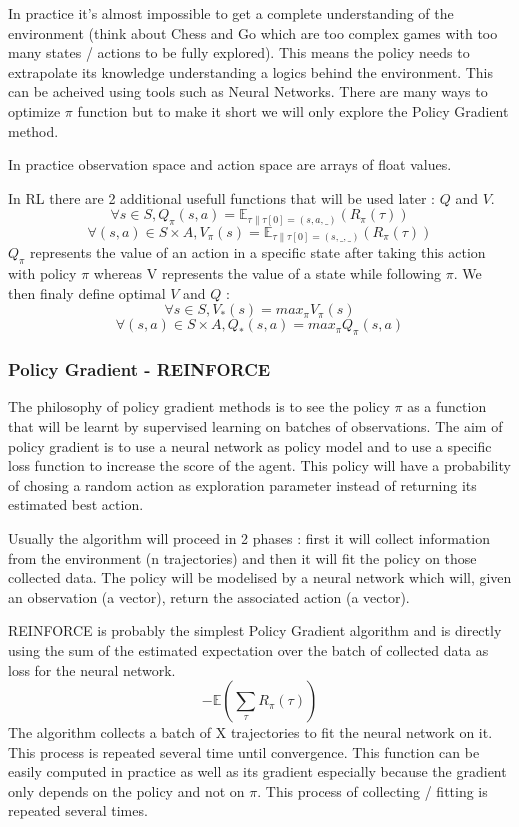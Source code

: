 \documentclass[11pt]{article}
\begin{document}
In practice it's almost impossible to get a complete understanding of the environment (think about Chess and Go which are too complex games with too many states / actions to be fully explored). This means the policy needs to extrapolate its knowledge understanding a logics behind the environment. This can be acheived using tools such as Neural Networks. There are many ways to optimize $\pi$ function but to make it short we will only explore the Policy Gradient method.

In practice observation space and action space are arrays of float values.

In RL there are 2 additional usefull functions that will be used later : $Q$ and $V$. 
$$\forall s\in S, Q_\pi(s,a)=\mathbb{E}_{\tau\|\tau[0]=(s,a,\_)}(R_\pi(\tau)) $$
$$\forall (s,a)\in S\times A, V_\pi(s)=\mathbb{E}_{\tau\|\tau[0]=(s,\_,\_)}(R_\pi(\tau)) $$
$Q_\pi$ represents the value of an action in a specific state after taking this action with policy $\pi$ whereas V represents the value of a state while following $\pi$. We then finaly define optimal $V$ and $Q$ :
$$\forall s\in S,V_*(s) = max_\pi V_\pi(s)$$
$$\forall (s,a)\in S\times A,Q_*(s,a) = max_\pi Q_\pi(s,a)$$



\subsubsection{Policy Gradient - REINFORCE}
The philosophy of policy gradient methods is to see the policy $\pi$ as a function that will be learnt by supervised learning on batches of observations.  The aim of policy gradient is to use a neural network as policy model and to use a specific loss function to increase the score of the agent. This policy will have a probability of chosing a random action as exploration parameter instead of returning its estimated best action.

Usually the algorithm will proceed in 2 phases : first it will collect information from the environment (n trajectories) and then it will fit the policy on those collected data. The policy will be modelised by a neural network which will, given an observation (a vector), return the associated action (a vector).

REINFORCE is probably the simplest Policy Gradient algorithm and is directly using the sum of the estimated expectation over the batch of collected data as loss for the neural network.
$$-\mathbb{E}(\sum_{\tau}R_{\pi}(\tau))$$
The algorithm collects a batch of X trajectories to fit the neural network on it. This process is repeated several time until convergence.
This function can be easily computed in practice as well as its gradient especially because the gradient only depends on the policy and not on $\pi$. This process of collecting / fitting is repeated several times.
\end{document}
